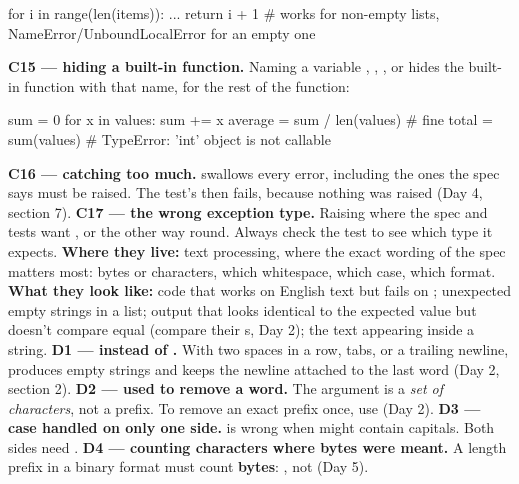 \documentclass[10pt,a4paper]{article}
\begin{document}
\begin{pycode}
for i in range(len(items)):
    ...
return i + 1              # works for non-empty lists, NameError/UnboundLocalError for an empty one
\end{pycode}
\textbf{C15 — hiding a built-in function.} Naming a variable , , ,  or  hides the built-in function with that name, for the rest of the function:
\begin{pycode}
sum = 0
for x in values:
    sum += x
average = sum / len(values)    # fine
total = sum(values)            # TypeError: 'int' object is not callable
\end{pycode}
\textbf{C16 — catching too much.}  swallows every error, including the ones the spec says must be raised. The test’s  then fails, because nothing was raised (Day 4, section 7).
\textbf{C17 — the wrong exception type.} Raising  where the spec and tests want , or the other way round. Always check the test to see which type it expects.
\textbf{Where they live:} text processing, where the exact wording of the spec matters most: bytes or characters, which whitespace, which case, which format.
\textbf{What they look like:} code that works on English text but fails on ; unexpected empty strings in a list; output that looks identical to the expected value but doesn’t compare equal (compare their s, Day 2); the text  appearing inside a string.
\textbf{D1 —  instead of .} With two spaces in a row, tabs, or a trailing newline,  produces empty strings and keeps the newline attached to the last word (Day 2, section 2).
\textbf{D2 —  used to remove a word.} The argument is a \emph{set of characters}, not a prefix. To remove an exact prefix once, use  (Day 2).
\textbf{D3 — case handled on only one side.}  is wrong when  might contain capitals. Both sides need .
\textbf{D4 — counting characters where bytes were meant.} A length prefix in a binary format must count \textbf{bytes}: , not  (Day 5).
\end{document}
